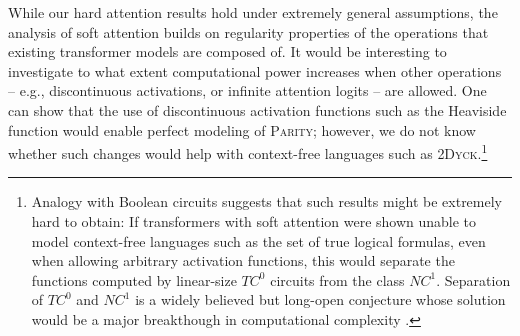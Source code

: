 \documentclass[11pt,a4paper]{article}
\begin{document}
While our hard attention results hold under extremely general assumptions, the analysis of soft attention builds on regularity properties of the operations that existing transformer models are composed of.
It would be interesting to investigate to what extent computational power increases when other operations -- e.g., discontinuous activations, or infinite attention logits -- are allowed.
One can show that the use of discontinuous activation functions such as the Heaviside function would enable perfect modeling of \textsc{Parity}; however, we do not know whether such changes would help with context-free languages such as \textsc{2Dyck}.\footnote{Analogy with Boolean circuits suggests that such results might be extremely hard to obtain: If transformers with soft attention were shown unable to model context-free languages such as the set of true logical formulas, even when allowing arbitrary activation functions, this would separate the functions computed by linear-size $TC^0$ circuits from the class $NC^1$. Separation of $TC^0$ and $NC^1$ is a widely believed but long-open conjecture whose solution would be a major breakthough in computational complexity \cite{arora2009computational}.}











\end{document}
